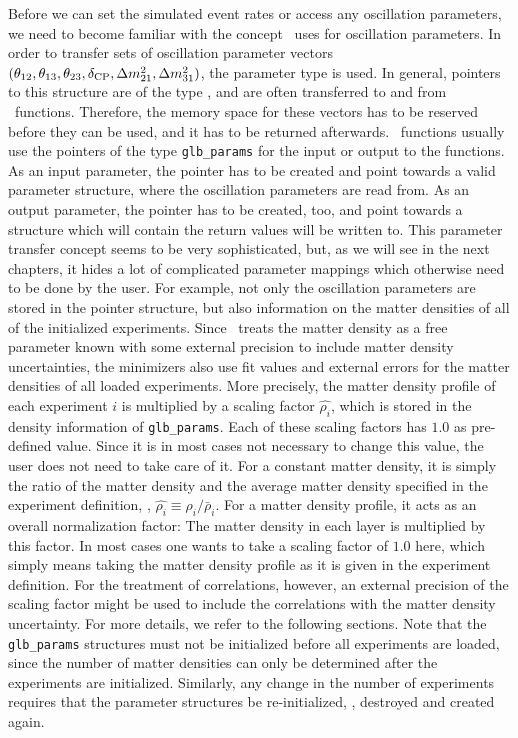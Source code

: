 Before we can set the simulated event rates or access any oscillation
parameters, we need to become familiar with the concept \GLOBES\ uses
for oscillation parameters. In order to transfer sets of oscillation
parameter vectors $(\theta_{12}, \theta_{13}, \theta_{23}, \delta_{\mathrm{CP}}, \Delta m_{21}^2, \Delta m_{31}^2)$, the parameter type  is used. In general, pointers to this structure are of the type , and are often
transferred to and from \GLOBES\ functions. Therefore, the memory space
for these vectors has to be reserved before they can be used, and it has
to be returned afterwards. \GLOBES\ functions usually use the pointers
of the type {\tt glb\_params} for the input or output to the functions. As
an input parameter, the pointer has to be created and point towards a valid
parameter structure, where the oscillation parameters are read from. As
an output parameter, the pointer has to be created, too, and point towards
a structure which will contain the return values will be written to.
This parameter transfer concept seems to be very sophisticated, but, as we
will see in the next chapters, it hides a lot of complicated parameter 
mappings which otherwise need to be done by the user. For example, not
only the oscillation parameters are stored in the pointer structure, but also information on the matter
densities of all of the initialized experiments. Since \GLOBES\ treats
the matter density as a free parameter known with some external precision
to include matter density uncertainties,
the minimizers also use fit values and external errors for the matter
densities of all loaded experiments. More precisely, the matter density
profile of each experiment $i$ is multiplied by a scaling factor
$\hat{\rho_i}$,  
which is stored in the density information of {\tt glb\_params}. 
Each of
these scaling factors has $1.0$ as pre-defined value. Since it
is in most cases not necessary to change this value, the user does
not need to take care of it. For a constant matter density, it is simply the ratio of the matter density and the average matter density specified in the experiment definition, \ie , $\hat{\rho_i} \equiv \rho_i/\bar{\rho}_i$. For a matter density profile, it acts as an overall normalization factor: The matter density in each layer is multiplied by this factor. In most cases one wants to take a scaling factor of $1.0$ here, which simply means taking the matter density profile as it is given in the experiment definition. For the treatment of correlations, however,
an external precision of the scaling factor might be used to include the
correlations with the matter density uncertainty. For more details, we
refer to the following sections.
Note that the {\tt glb\_params}
structures must not be initialized before all experiments are loaded,
since the number of matter densities can only be determined after the
experiments are initialized. 
Similarly, any change in the number of experiments requires that the
parameter structures be re-initialized, \ie, destroyed and created again.

